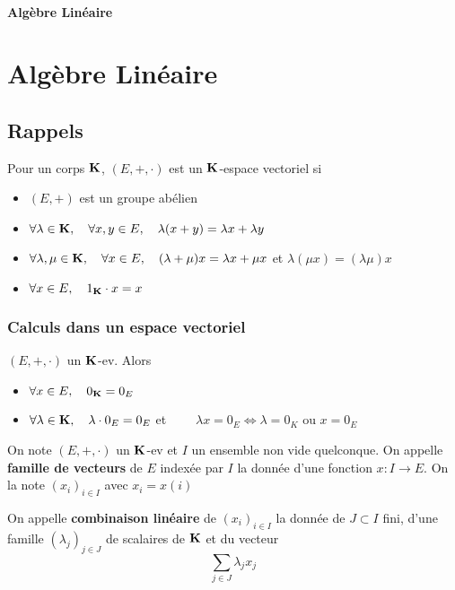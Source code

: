 \ifsolo
~

\vspace{1cm}

\begin{center}
    \textbf{\LARGE Algèbre Linéaire} \\[1em]
\end{center}
\tableofcontents
\else
\chapter{Algèbre Linéaire}

\minitoc
\fi
\thispagestyle{empty}

\section{Rappels}

\begin{dfn}
    Pour un corps $\mathbf K$, $(E, +, \cdot)$ est un  $\mathbf K$-espace vectoriel si \begin{itemize}
        \item $(E, +)$ est un groupe abélien
        \item $\forall \lambda \in \mathbf K,\quad \forall  x,y\in E,\quad \lambda(x+y)=\lambda x+\lambda y$
        \item $\forall \lambda,\mu \in  \mathbf K,\quad  \forall  x \in  E,\quad (\lambda+\mu)x=\lambda x+\mu x$ et $\lambda(\mu x)=(\lambda\mu)x$
        \item $\forall x \in  E, \quad  1_{\mathbf K}\cdot x=x$
    \end{itemize}
\end{dfn}

\subsection{Calculs dans un espace vectoriel}

\begin{rem}[Rappel]
    $(E, +, \cdot)$ un  $\mathbf K$-ev. Alors \begin{itemize}
        \item $\forall  x \in  E,\quad 0_{\mathbf K}=0_E$
        \item $\forall  \lambda \in  \mathbf K,\quad  \lambda \cdot 0_E=0_E$ et $\qquad \lambda x=0_E \iff \lambda=0_K$ ou $x=0_E$
        \end{itemize}
    \end{rem}

    \begin{dfn}
        On note $(E, +, \cdot)$ un  $\mathbf K$-ev et $I$ un ensemble non vide quelconque. On appelle  \textbf{famille de vecteurs} de $E$ indexée par  $I$ la donnée d'une fonction  $x:I\to E$. On la note $(x_i)_{i \in  I}$ avec $x_i=x(i)$

        On appelle \textbf{combinaison linéaire} de $(x_i)_{i \in  I}$ la donnée de $J\subset I$ fini, d'une famille  $(\lambda_j)_{j \in  J}$ de scalaires de $\mathbf K$ et du vecteur \[
            \sum_{j \in  J} \lambda_j x_j
        \]
    \end{dfn}

